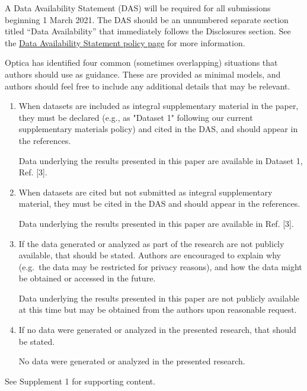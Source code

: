 \documentclass{optica-article}
\begin{document}
\begin{backmatter}
	A Data Availability Statement (DAS) will be required for all submissions
	beginning 1 March 2021. The DAS should be an unnumbered separate section
	titled ``Data Availability'' that
	immediately follows the Disclosures section. See the
	\href{https://opg.optica.org/submit/review/data-availability-policy.cfm}
	{Data Availability Statement policy page} for more information.

	Optica has identified four common (sometimes overlapping) situations that
	authors should use as guidance. These are provided as minimal models, and
	authors should feel free to
	include any additional details that may be relevant.

	\begin{enumerate}
		\item When datasets are included as integral supplementary material in
		      the paper, they must be declared (e.g., as "Dataset 1" following our
		      current supplementary materials policy) and cited in the DAS, and should
		      appear in the references.

		       Data underlying the results
		      presented in this paper are available in Dataset 1, Ref. [3].

		      \bigskip

		\item When datasets are cited but not submitted as integral
		      supplementary material, they must be cited in the DAS and should appear
		      in the references.

		       Data underlying the results
		      presented in this paper are available in Ref. [3].

		      \bigskip

		\item If the data generated or analyzed as part of the research are not
		      publicly available, that should be stated. Authors are encouraged to
		      explain why (e.g.~the data may be restricted for privacy reasons), and
		      how the data might be obtained or accessed in the future.

		       Data underlying the results
		      presented in this paper are not publicly available at this time
		      but may be obtained from the authors upon reasonable request.

		      \bigskip

		\item If no data were generated or analyzed in the presented research,
		      that should be stated.

		       No data were generated or analyzed
		      in the presented research.
	\end{enumerate}


	See Supplement 1 for supporting content.

\end{backmatter}
\end{document}
